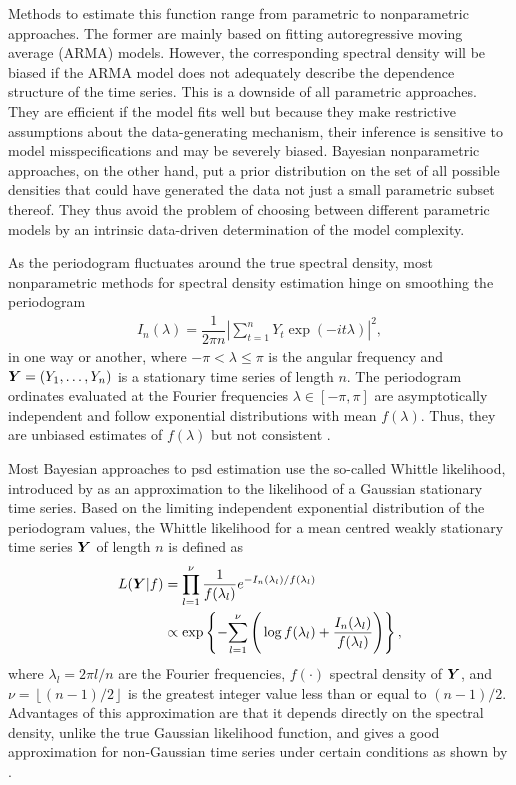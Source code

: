 \documentclass[twocolumn,final]{svjour3}
\newcommand{\bm}[1]{\mbox{\boldmath $#1$}}
\newcommand{\pmr}{ \color{red}}
\begin{document}
Methods to estimate this function range from parametric to nonparametric approaches.  The former are mainly based on fitting  autoregressive moving average (ARMA) models. However, the corresponding spectral density will be biased if the ARMA model does not adequately describe the dependence structure of the time series. This is a downside of all parametric approaches.
They are efficient if the model fits well but because they make restrictive assumptions about the data-generating mechanism, their inference is sensitive to model misspecifications and may  be severely biased. 
Bayesian nonparametric approaches, on the other hand, put a prior distribution on the set of all possible densities that could have generated the data not just a small parametric subset thereof. They thus avoid the problem of choosing between different parametric models  by an intrinsic data-driven determination of the model complexity.

As the periodogram fluctuates around the true spectral density, most  nonparametric methods for spectral density estimation hinge on  smoothing the periodogram
\begin{align*}
I_n(\lambda) = \dfrac{1}{2 \pi n} \left| \sum_{t=1}^{n} Y_t \exp \left( -i t \lambda\right)\right|^2,
\end{align*}
in one way or another, where $-\pi < \lambda \leq \pi$ is the angular frequency and $\bm{Y}=(Y_1,\ldots,Y_n)$ is a stationary time series of length $n$. {\pmr The periodogram ordinates evaluated at the Fourier frequencies $\lambda \in [-\pi,\pi]$  are asymptotically independent and follow exponential distributions with mean $f(\lambda)$.  Thus, they are unbiased estimates of $f(\lambda)$  but not consistent \citep{Brockwell:1986}.}


Most Bayesian approaches to psd estimation use the so-called Whittle likelihood, introduced by \cite{Whittle:1957} as an approximation to the likelihood of a Gaussian stationary time series.  Based on the  limiting independent exponential distribution of the periodogram values, the Whittle likelihood for a mean centred weakly stationary time series $\bm{Y}$ of length $n$ is defined as
\begin{align}
L(\bm{Y} | f) &= \prod_{l=1}^{\nu}\dfrac{1}{f(\lambda_{l})} e^{-I_n(\lambda_l)/f(\lambda_l)}  \nonumber \\
&\propto \exp \left\{ -\! \sum_{l=1}^{\nu} \Bigg( \log f(\lambda_l) + \dfrac{I_{n}(\lambda_l)}{f(\lambda_l)} \Bigg) \right\},\label{eq:whittle_like}
\end{align}
where $\lambda_l = 2\pi l / n$ are the Fourier frequencies, $f(\cdot)$ spectral density of $\bm{Y}$, and $\nu = \left\lfloor (n-1)/2 \right\rfloor$ is the greatest integer value less than or equal to $(n-1)/2$. Advantages of this approximation are that it depends directly on the spectral density, unlike the true Gaussian likelihood function, and gives a good approximation for non-Gaussian time series under certain conditions as shown by \cite{ShaoXiaofeng2007ASTf}.
\end{document}
